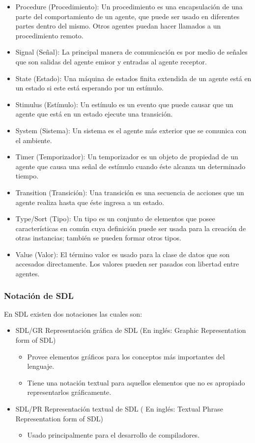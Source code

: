 \begin{itemize}
\item Procedure (Procedimiento): Un procedimiento es una encapsulaci\'on de una 
parte del comportamiento de un agente, que puede ser usado en diferentes partes 
dentro del mismo. Otros agentes puedan hacer llamados a un procedimiento remoto.
\item Signal (Se\~nal): La principal manera de comunicaci\'on es por 
medio de se\~nales que son salidas del agente emisor y entradas al agente 
receptor.
\item State (Estado): Una m\'aquina de estados finita extendida de un 
agente est\'a en un estado si este est\'a esperando por un est\'imulo.
\item Stimulus (Est\'imulo): Un est\'imulo es un evento que puede 
causar que un agente que est\'a en un estado  ejecute una transici\'on.
\item System (Sistema): Un sistema es el agente m\'as exterior que se comunica 
con el ambiente.
\item Timer (Temporizador): Un temporizador es un objeto de propiedad de 
un agente que causa una se\~nal de est\'imulo cuando \'este alcanza un 
determinado tiempo.
\item Transition (Transici\'on): Una transici\'on es una secuencia 
de acciones que un agente realiza hasta que \'este ingresa a un estado.
\item Type/Sort (Tipo): Un tipo es un conjunto de elementos que 
posee caracter\'isticas en com\'un cuya definici\'on puede ser usada para la 
creaci\'on de otras instancias; tambi\'en se pueden formar otros tipos.
\item Value (Valor): El t\'ermino valor es usado para la clase de datos 
que son accesados directamente. Los valores pueden ser pasados con libertad 
entre agentes.

\end{itemize}

\subsubsection{Notaci\'on de SDL}
En SDL existen dos notaciones las cuales son: 

\begin{itemize}
\item SDL/GR   Representaci\'on gr\'afica de SDL (En ingl\'es: Graphic 
Representation form of SDL)
\begin{itemize}
\item Provee elementos gr\'aficos para los conceptos m\'as importantes del 
lenguaje.
\item Tiene una notaci\'on textual para aquellos elementos que no es apropiado 
representarlos gr\'aficamente.
\end{itemize}
\item SDL/PR  Representaci\'on textual de SDL ( En ingl\'es: Textual Phrase 
Representation form of SDL)
\begin{itemize}
\item Usado principalmente para el desarrollo de compiladores.
\end{itemize}
\end{itemize}

